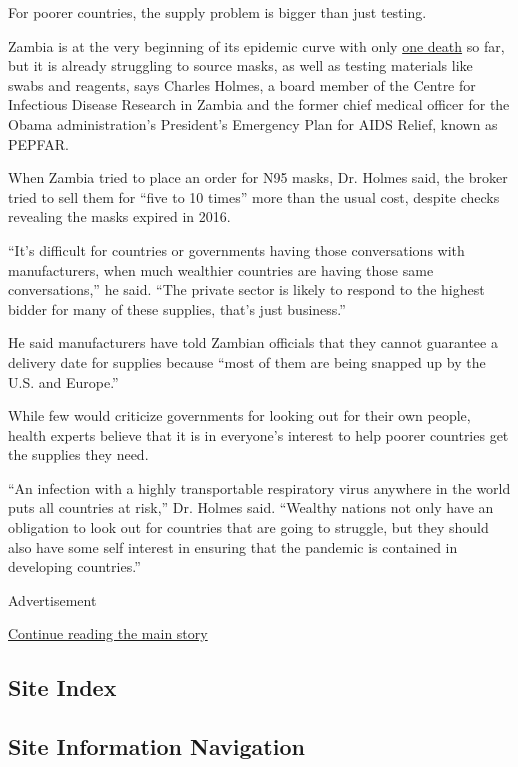 For poorer countries, the supply problem is bigger than just testing.

Zambia is at the very beginning of its epidemic curve with only
\href{https://af.reuters.com/article/zambiaNews/idAFL8N2BQ3WC}{one
death} so far, but it is already struggling to source masks, as well as
testing materials like swabs and reagents, says Charles Holmes, a board
member of the Centre for Infectious Disease Research in Zambia and the
former chief medical officer for the Obama administration's President's
Emergency Plan for AIDS Relief, known as PEPFAR.

When Zambia tried to place an order for N95 masks, Dr. Holmes said, the
broker tried to sell them for ``five to 10 times'' more than the usual
cost, despite checks revealing the masks expired in 2016.

``It's difficult for countries or governments having those conversations
with manufacturers, when much wealthier countries are having those same
conversations,'' he said. ``The private sector is likely to respond to
the highest bidder for many of these supplies, that's just business.''

He said manufacturers have told Zambian officials that they cannot
guarantee a delivery date for supplies because ``most of them are being
snapped up by the U.S. and Europe.''

While few would criticize governments for looking out for their own
people, health experts believe that it is in everyone's interest to help
poorer countries get the supplies they need.

``An infection with a highly transportable respiratory virus anywhere in
the world puts all countries at risk,'' Dr. Holmes said. ``Wealthy
nations not only have an obligation to look out for countries that are
going to struggle, but they should also have some self interest in
ensuring that the pandemic is contained in developing countries.''

Advertisement

\protect\hyperlink{after-bottom}{Continue reading the main story}

\hypertarget{site-index}{%
\subsection{Site Index}\label{site-index}}

\hypertarget{site-information-navigation}{%
\subsection{Site Information
Navigation}\label{site-information-navigation}}

